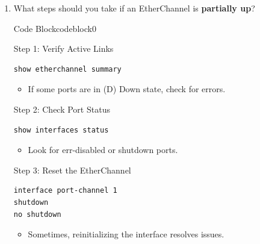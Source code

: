 \documentclass[a4paper]{article}
\begin{document}
\begin{enumerate}
\begin{ocg}{Code Block}{codeblock}{0}
		      Example Mismatch Check:
		      \begin{lstlisting}
show interfaces FastEthernet0/1 status
                \end{lstlisting}
		      Solution:
		      \begin{lstlisting}
interface range FastEthernet0/1 - 4
speed 1000
duplex full
            \end{lstlisting}



		      \vspace{0.5cm}
	      \end{ocg}

	\item What steps should you take if an EtherChannel is \textbf{partially up}?
	


 \begin{ocg}{Code Block}{codeblock}{0}

     \vspace{0.5cm}
     Step 1: Verify Active Links
     \begin{lstlisting}
show etherchannel summary
    \end{lstlisting}
    \begin{itemize}
        \item \small If some ports are in (D) Down state, check for errors.
    \end{itemize}
    

    Step 2: Check Port Status
    \begin{lstlisting}
show interfaces status
    \end{lstlisting}
    \begin{itemize}
        \item \small Look for err-disabled or shutdown ports.
    \end{itemize}


    Step 3: Reset the EtherChannel
    \begin{lstlisting}
interface port-channel 1
shutdown
no shutdown
    \end{lstlisting}
    \begin{itemize}
        \item \small Sometimes, reinitializing the interface resolves issues.
    \end{itemize}

     \vspace{0.5cm}
 \end{ocg}

\end{enumerate}
\end{document}
